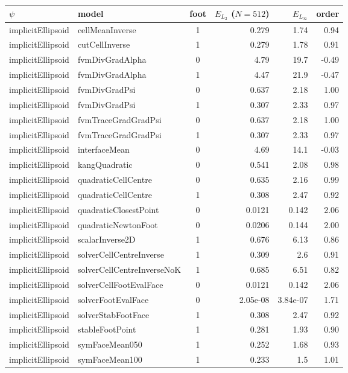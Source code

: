 \begin{tabular}{l l c r r r}
\hline
$\psi$ & model & foot & $E_{L_2}$ ($N{=}512$) & $E_{L_\infty}$ & order \\
\hline
implicitEllipsoid & cellMeanInverse & 1 & 0.279 & 1.74 & 0.94 \\
implicitEllipsoid & cutCellInverse & 1 & 0.279 & 1.78 & 0.91 \\
implicitEllipsoid & fvmDivGradAlpha & 0 & 4.79 & 19.7 & -0.49 \\
implicitEllipsoid & fvmDivGradAlpha & 1 & 4.47 & 21.9 & -0.47 \\
implicitEllipsoid & fvmDivGradPsi & 0 & 0.637 & 2.18 & 1.00 \\
implicitEllipsoid & fvmDivGradPsi & 1 & 0.307 & 2.33 & 0.97 \\
implicitEllipsoid & fvmTraceGradGradPsi & 0 & 0.637 & 2.18 & 1.00 \\
implicitEllipsoid & fvmTraceGradGradPsi & 1 & 0.307 & 2.33 & 0.97 \\
implicitEllipsoid & interfaceMean & 0 & 4.69 & 14.1 & -0.03 \\
implicitEllipsoid & kangQuadratic & 0 & 0.541 & 2.08 & 0.98 \\
implicitEllipsoid & quadraticCellCentre & 0 & 0.635 & 2.16 & 0.99 \\
implicitEllipsoid & quadraticCellCentre & 1 & 0.308 & 2.47 & 0.92 \\
implicitEllipsoid & quadraticClosestPoint & 0 & 0.0121 & 0.142 & 2.06 \\
implicitEllipsoid & quadraticNewtonFoot & 0 & 0.0206 & 0.144 & 2.00 \\
implicitEllipsoid & scalarInverse2D & 1 & 0.676 & 6.13 & 0.86 \\
implicitEllipsoid & solverCellCentreInverse & 1 & 0.309 & 2.6 & 0.91 \\
implicitEllipsoid & solverCellCentreInverseNoK & 1 & 0.685 & 6.51 & 0.82 \\
implicitEllipsoid & solverCellFootEvalFace & 0 & 0.0121 & 0.142 & 2.06 \\
implicitEllipsoid & solverFootEvalFace & 0 & 2.05e-08 & 3.84e-07 & 1.71 \\
implicitEllipsoid & solverStabFootFace & 1 & 0.308 & 2.47 & 0.92 \\
implicitEllipsoid & stableFootPoint & 1 & 0.281 & 1.93 & 0.90 \\
implicitEllipsoid & symFaceMean050 & 1 & 0.252 & 1.68 & 0.93 \\
implicitEllipsoid & symFaceMean100 & 1 & 0.233 & 1.5 & 1.01 \\

\end{tabular}
